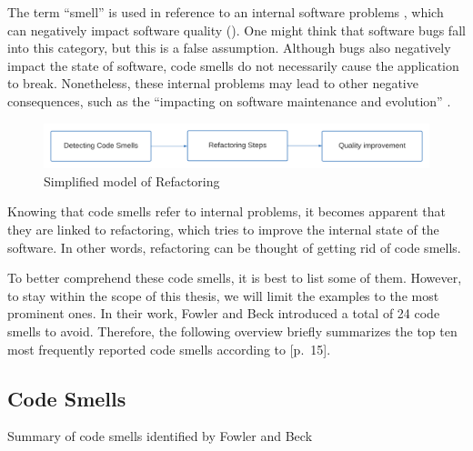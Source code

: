The term “smell” is used in reference to an internal software problems
	\textcite[p.~2]{lacerda2020}, 
	which can negatively impact software quality 
	(\cite[p.~1]{sonnleithner2021}). 
One might think that software bugs fall into this category, 
	but this is a false assumption.
Although bugs also negatively impact the state of software, 
	code smells do not necessarily cause the application to break.
Nonetheless, these internal problems may lead to other negative consequences,
	such as the “impacting on software maintenance and evolution”
	\cite[p.~2]{lacerda2020}.
 
\begin{figure}[htp]
    \centering
    \includegraphics[width=\textwidth]{./assets/simple_process.png}
    \caption{Simplified model of Refactoring}
\end{figure}

Knowing that code smells refer to internal problems,
	it becomes apparent that they are linked to refactoring, 
	which tries to improve the internal state of the software.
In other words, 
	refactoring can be thought of getting rid of code smells. 

To better comprehend these code smells, it is best to list some of them. 
However, to stay within the scope of this thesis, 
	we will limit the examples to the most prominent ones. 
In their work, Fowler and Beck introduced a total of 24 code smells to avoid.
Therefore, 
	the following overview briefly summarizes 
	the top ten most frequently reported code smells according to 
	[p.~15]\textcite{lacerda2020}.

\subsection{Code Smells}
\label{sec:smells}

Summary of code smells identified by Fowler and Beck \textcite{fowler2018} 

